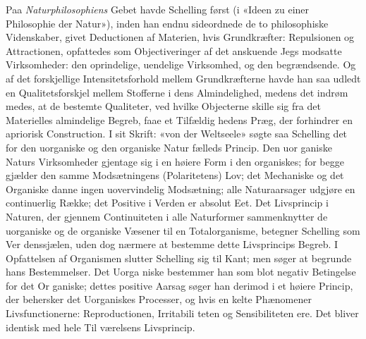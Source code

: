 \documentclass[12pt,a4paper]{book}
\begin{document}
Paa \emph{Naturphilosophiens} Gebet havde Schelling først
(i «Ideen zu einer Philosophie der Natur»), inden han endnu
sideordnede de to philosophiske Videnskaber, givet Deductionen
af Materien, hvis Grundkræfter: Repulsionen og Attractionen,
opfattedes som Objectiveringer af det anskuende Jegs modsatte
Virksomheder: den oprindelige, uendelige Virksomhed, og den
begrændsende. Og af det forskjellige Intensitetsforhold mellem
Grundkræfterne havde han saa udledt en Qualitetsforskjel
mellem Stofferne i dens Almindelighed, medens det indrøm\-%
medes, at de bestemte Qualiteter, ved hvilke Objecterne skille
sig fra det Materielles almindelige Begreb, faae et Tilfældig\-%
hedens Præg, der forhindrer en apriorisk Construction. I sit
Skrift: «von der Weltseele» søgte saa Schelling det for den
uorganiske og den organiske Natur fælleds Princip. Den uor\-%
ganiske Naturs Virksomheder gjentage sig i en høiere Form i
den organiskes; for begge gjælder den samme Modsætningens
(Polaritetens) Lov; det Mechaniske og det Organiske danne
ingen uovervindelig Modsætning; alle Naturaarsager udgjøre en
continuerlig Række; det Positive i Verden er absolut Eet.
Det Livsprincip i Naturen, der gjennem Continuiteten i alle
Naturformer sammenknytter de uorganiske og de organiske
Væsener til en Totalorganisme, betegner Schelling som Ver\-%
denssjælen, uden dog nærmere at bestemme dette Livsprincips
Begreb. I Opfattelsen af Organismen slutter Schelling sig til
Kant; men søger at begrunde hans Bestemmelser. Det Uorga\-%
niske bestemmer han som blot negativ Betingelse for det Or\-%
ganiske; dettes positive Aarsag søger han derimod i et høiere
Princip, der behersker det Uorganiskes Processer, og hvis en\-%
kelte Phænomener Livsfunctionerne: Reproductionen, Irritabili\-%
teten og Sensibiliteten ere. Det bliver identisk med hele Til\-%
værelsens Livsprincip.
\end{document}
